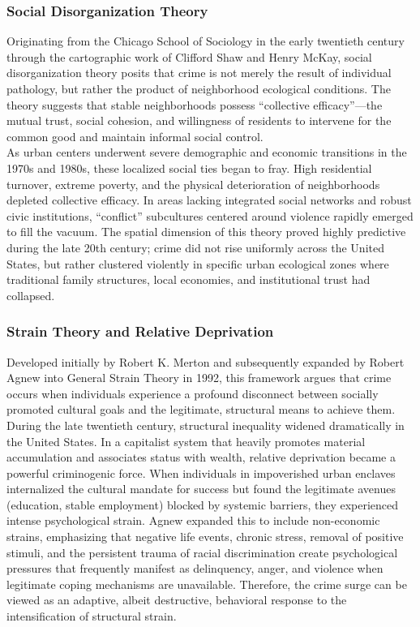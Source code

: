 \documentclass[
]{article}
\begin{document}
\subsubsection{\texorpdfstring{\textbf{Social Disorganization
Theory}}{Social Disorganization Theory}}\label{social-disorganization-theory}

Originating from the Chicago School of Sociology in the early twentieth
century through the cartographic work of Clifford Shaw and Henry McKay,
social disorganization theory posits that crime is not merely the result
of individual pathology, but rather the product of neighborhood
ecological conditions. The theory suggests that stable neighborhoods
possess ``collective efficacy''---the mutual trust, social cohesion, and
willingness of residents to intervene for the common good and maintain
informal social control.\\
As urban centers underwent severe demographic and economic transitions
in the 1970s and 1980s, these localized social ties began to fray. High
residential turnover, extreme poverty, and the physical deterioration of
neighborhoods depleted collective efficacy. In areas lacking integrated
social networks and robust civic institutions, ``conflict'' subcultures
centered around violence rapidly emerged to fill the vacuum. The spatial
dimension of this theory proved highly predictive during the late 20th
century; crime did not rise uniformly across the United States, but
rather clustered violently in specific urban ecological zones where
traditional family structures, local economies, and institutional trust
had collapsed.

\subsubsection{\texorpdfstring{\textbf{Strain Theory and Relative
Deprivation}}{Strain Theory and Relative Deprivation}}\label{strain-theory-and-relative-deprivation}

Developed initially by Robert K. Merton and subsequently expanded by
Robert Agnew into General Strain Theory in 1992, this framework argues
that crime occurs when individuals experience a profound disconnect
between socially promoted cultural goals and the legitimate, structural
means to achieve them.\\
During the late twentieth century, structural inequality widened
dramatically in the United States. In a capitalist system that heavily
promotes material accumulation and associates status with wealth,
relative deprivation became a powerful criminogenic force. When
individuals in impoverished urban enclaves internalized the cultural
mandate for success but found the legitimate avenues (education, stable
employment) blocked by systemic barriers, they experienced intense
psychological strain. Agnew expanded this to include non-economic
strains, emphasizing that negative life events, chronic stress, removal
of positive stimuli, and the persistent trauma of racial discrimination
create psychological pressures that frequently manifest as delinquency,
anger, and violence when legitimate coping mechanisms are unavailable.
Therefore, the crime surge can be viewed as an adaptive, albeit
destructive, behavioral response to the intensification of structural
strain.
\end{document}
